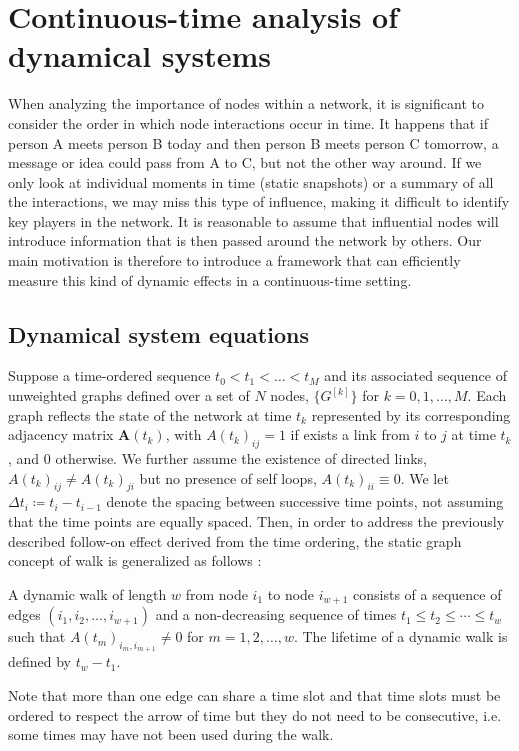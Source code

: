 \chapter{Continuous-time analysis of dynamical systems}
\label{chap:cont}
When analyzing the importance of nodes within a network, it is significant to consider the order in which node interactions occur in time. It happens that if person A meets person B today and then person B meets person C tomorrow, a message or idea could pass from A to C, but not the other way around. If we only look at individual moments in time (static snapshots) or a summary of all the interactions, we may miss this type of influence, making it difficult to identify key players in the network. It is reasonable to assume that influential nodes will introduce information that is then passed around the network by others. Our main motivation is therefore to introduce a framework that can efficiently measure this kind of dynamic effects in a continuous-time setting.

\section{Dynamical system equations}
\label{sec:ode}
Suppose a time-ordered sequence $t_0 < t_1 < \dots < t_M $ and its associated sequence of unweighted graphs defined over a set of $N$ nodes, $\{G^{[k]}\}$ for $k = 0,1,\dots,M$. Each graph reflects the state of the network at time $t_k$ represented by its corresponding adjacency matrix $\mathbf{A}(t_k)$, with $A(t_k)_{ij} = 1$ if exists a link from $i$ to $j$ at time $t_k$, and $0$ otherwise. We further assume the existence of directed links, $A(t_k)_{ij} \ne A(t_k)_{ji}$ but no presence of self loops, $A(t_k)_{ii} \equiv 0$. We let $\Delta t_i \coloneqq t_i - t_{i-1}$ denote the spacing between successive time points, not assuming that the time points are equally spaced. Then, in order to address the previously described follow-on effect derived from the time ordering, the static graph concept of walk is generalized as follows \cite{grindrod2011communicability}:
\begin{definition}
    A dynamic walk of length $w$ from node $i_1$ to node $i_{w+1}$ consists of a sequence of edges $(i_1,i_2,\dots,i_{w+1})$ and a non-decreasing sequence of times $t_1\le t_2\le \cdots \le t_w$ such that $A(t_m)_{i_m,i_{m+1}}\ne 0$ for $m=1,2,\dots,w$. The lifetime of a dynamic walk is defined by $t_w - t_1$. 
\end{definition}
Note that more than one edge can share a time slot and that time slots must be ordered to respect the arrow of time but they do not need to be consecutive, i.e. some times may have not been used during the walk.

